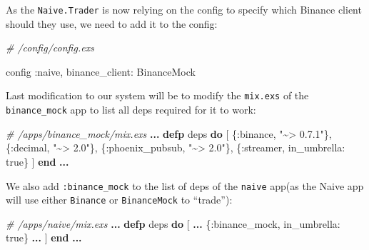 \documentclass[
  oneside]{book}
\newenvironment{Shaded}{\begin{snugshade}}{\end{snugshade}}
\newcommand{\CommentTok}[1]{\textcolor[rgb]{0.56,0.35,0.01}{\textit{#1}}}
\newcommand{\ConstantTok}[1]{\textcolor[rgb]{0.00,0.00,0.00}{#1}}
\newcommand{\KeywordTok}[1]{\textcolor[rgb]{0.13,0.29,0.53}{\textbf{#1}}}
\newcommand{\NormalTok}[1]{#1}
\newcommand{\OperatorTok}[1]{\textcolor[rgb]{0.81,0.36,0.00}{\textbf{#1}}}
\newcommand{\StringTok}[1]{\textcolor[rgb]{0.31,0.60,0.02}{#1}}
\newcommand{\VariableTok}[1]{\textcolor[rgb]{0.00,0.00,0.00}{#1}}
\begin{document}
As the \texttt{Naive.Trader} is now relying on the config to specify which Binance client should they use, we need to add it to the config:

\begin{Shaded}
\begin{Highlighting}[]
\CommentTok{\# /config/config.exs}

\NormalTok{config }\VariableTok{:naive}\NormalTok{,}
  \VariableTok{binance\_client:} \ConstantTok{BinanceMock}
\end{Highlighting}
\end{Shaded}

Last modification to our system will be to modify the \texttt{mix.exs} of the \texttt{binance\_mock} app to list all deps required for it to work:

\begin{Shaded}
\begin{Highlighting}[]
\CommentTok{\# /apps/binance\_mock/mix.exs}
\OperatorTok{...}
  \KeywordTok{defp}\NormalTok{ deps }\KeywordTok{do}
\NormalTok{    [}
\NormalTok{      \{}\VariableTok{:binance}\NormalTok{, }\StringTok{"\textasciitilde{}\textgreater{} 0.7.1"}\NormalTok{\},}
\NormalTok{      \{}\VariableTok{:decimal}\NormalTok{, }\StringTok{"\textasciitilde{}\textgreater{} 2.0"}\NormalTok{\},}
\NormalTok{      \{}\VariableTok{:phoenix\_pubsub}\NormalTok{, }\StringTok{"\textasciitilde{}\textgreater{} 2.0"}\NormalTok{\},}
\NormalTok{      \{}\VariableTok{:streamer}\NormalTok{, }\VariableTok{in\_umbrella:} \ConstantTok{true}\NormalTok{\}}
\NormalTok{    ]}
  \KeywordTok{end}
\OperatorTok{...}
\end{Highlighting}
\end{Shaded}

We also add \texttt{:binance\_mock} to the list of deps of the \texttt{naive} app(as the Naive app will use either \texttt{Binance} or \texttt{BinanceMock} to ``trade''):

\begin{Shaded}
\begin{Highlighting}[]
\CommentTok{\# /apps/naive/mix.exs}
\OperatorTok{...}
  \KeywordTok{defp}\NormalTok{ deps }\KeywordTok{do}
\NormalTok{    [}
      \OperatorTok{...}
\NormalTok{      \{}\VariableTok{:binance\_mock}\NormalTok{, }\VariableTok{in\_umbrella:} \ConstantTok{true}\NormalTok{\}}
      \OperatorTok{...}
\NormalTok{    ]}
  \KeywordTok{end}
\OperatorTok{...}
\end{Highlighting}
\end{Shaded}
\end{document}
